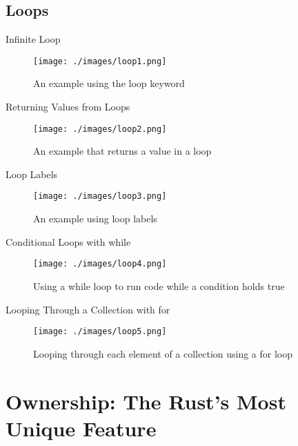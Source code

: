 \documentclass[10pt]{beamer}
\begin{document}
\subsection{Loops}
\begin{frame}{Infinite Loop}
    \begin{figure}[htpb]
        \centering
        \texttt{[image: ./images/loop1.png]}
        \caption{An example using the loop keyword\cite{rust-book}}
    \end{figure}
\end{frame}

\begin{frame}{Returning Values from Loops}
    \begin{figure}[htpb]
        \centering
        \texttt{[image: ./images/loop2.png]}
        \caption{An example that returns a value in a loop\cite{rust-book}}
    \end{figure}
\end{frame}

\begin{frame}{Loop Labels}
    \begin{figure}[htpb]
        \centering
        \texttt{[image: ./images/loop3.png]}
        \vspace*{-2mm}
        \caption{An example using loop labels\cite{rust-book}}
    \end{figure}
\end{frame}

\begin{frame}{Conditional Loops with while}
    \begin{figure}[htpb]
        \centering
        \texttt{[image: ./images/loop4.png]}
        \caption{Using a while loop to run code while a condition holds true\cite{rust-book}}
    \end{figure}
\end{frame}

\begin{frame}{Looping Through a Collection with for}
    \begin{figure}[htpb]
        \centering
        \texttt{[image: ./images/loop5.png]}
        \caption{Looping through each element of a collection using a for loop\cite{rust-book}}
    \end{figure}
\end{frame}

\section{Ownership: The Rust's Most Unique Feature}
\end{document}
